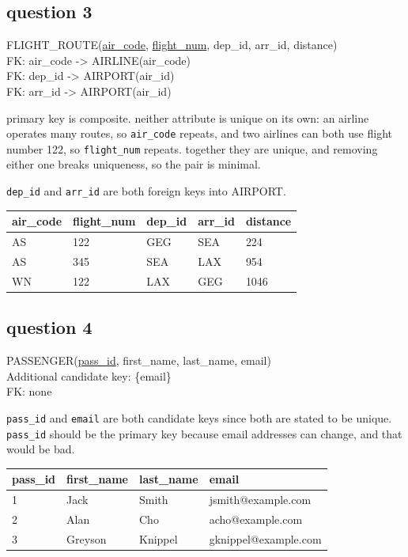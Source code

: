 \documentclass[12pt]{article}
\newcommand{\schema}[1]{%
  \begin{center}%
  \setlength{\fboxsep}{8pt}%
  \colorbox{gray!10}{%
    \begin{minipage}{0.93\linewidth}\ttfamily\small\raggedright #1\end{minipage}}%
  \end{center}%
}
\begin{document}
\subsection*{question 3}

\schema{
FLIGHT\_ROUTE(\underline{air\_code}, \underline{flight\_num}, dep\_id, arr\_id,
distance)\\[4pt]
FK: air\_code -> AIRLINE(air\_code)\\
FK: dep\_id -> AIRPORT(air\_id)\\
FK: arr\_id -> AIRPORT(air\_id)
}

primary key is composite. neither attribute is unique on its own: an
airline operates many routes, so \texttt{air\_code} repeats, and two airlines
can both use flight number 122, so \texttt{flight\_num} repeats. together they
are unique, and removing either one breaks uniqueness, so the pair is minimal.

\texttt{dep\_id} and \texttt{arr\_id} are both foreign keys into AIRPORT.

\begin{table}[H]
\centering
\begin{tabular}{|l|l|l|l|l|}
\hline
\textbf{air\_code} & \textbf{flight\_num} & \textbf{dep\_id} & \textbf{arr\_id} & \textbf{distance} \\
\hline
AS & 122 & GEG & SEA & 224 \\
AS & 345 & SEA & LAX & 954 \\
WN & 122 & LAX & GEG & 1046 \\
\hline
\end{tabular}
\end{table}

\subsection*{question 4}

\schema{
PASSENGER(\underline{pass\_id}, first\_name, last\_name, email)\\[4pt]
Additional candidate key: \{email\}\\
FK: none
}

\texttt{pass\_id} and \texttt{email} are both candidate keys since both are
stated to be unique. \texttt{pass\_id} should be the primary key because
email addresses can change, and that would be bad.

\begin{table}[H]
\centering
\begin{tabular}{|l|l|l|l|}
\hline
\textbf{pass\_id} & \textbf{first\_name} & \textbf{last\_name} & \textbf{email} \\
\hline
1 & Jack & Smith & jsmith@example.com \\
2 & Alan & Cho & acho@example.com \\
3 & Greyson & Knippel & gknippel@example.com \\
\hline
\end{tabular}
\end{table}
\end{document}
